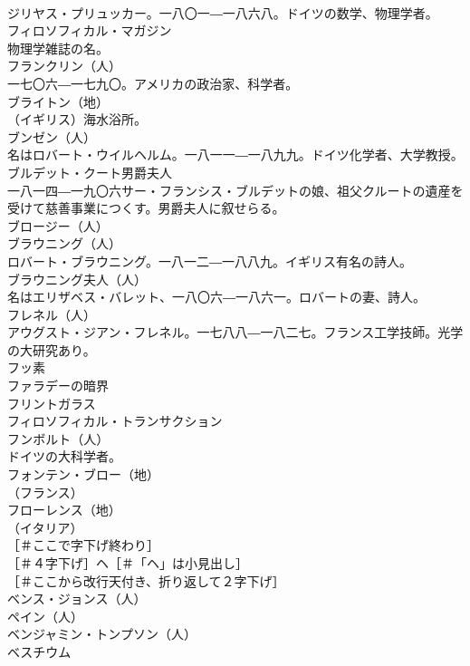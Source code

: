 \documentclass[8pt]{extreport}
\begin{document}
\begin{CJK}{UTF8}{min}
\\	ジリヤス・プリュッカー。一八〇一―一八六八。ドイツの数学、物理学者。
\\	フィロソフィカル・マガジン  
\\	物理学雑誌の名。
\\	フランクリン（人）
\\	一七〇六―一七九〇。アメリカの政治家、科学者。
\\	ブライトン（地）
\\	（イギリス）海水浴所。
\\	ブンゼン（人）
\\	名はロバート・ウイルヘルム。一八一一―一八九九。ドイツ化学者、大学教授。
\\	ブルデット・クート男爵夫人 
\\	一八一四―一九〇六サー・フランシス・ブルデットの娘、祖父クルートの遺産を受けて慈善事業につくす。男爵夫人に叙せらる。
\\	ブロージー（人）
\\	ブラウニング（人）
\\	ロバート・ブラウニング。一八一二―一八八九。イギリス有名の詩人。
\\	ブラウニング夫人（人）
\\	名はエリザベス・バレット、一八〇六―一八六一。ロバートの妻、詩人。
\\	フレネル（人）
\\	アウグスト・ジアン・フレネル。一七八八―一八二七。フランス工学技師。光学の大研究あり。
\\	フッ素 
\\	ファラデーの暗界 
\\	フリントガラス 
\\	フィロソフィカル・トランサクション 
\\	フンボルト（人）
\\	ドイツの大科学者。
\\	フォンテン・ブロー（地）
\\	（フランス）
\\	フローレンス（地）
\\	（イタリア）
\\	［＃ここで字下げ終わり］
\\	［＃４字下げ］ヘ［＃「ヘ」は小見出し］
\\	［＃ここから改行天付き、折り返して２字下げ］
\\	ベンス・ジョンス（人）
\\	ペイン（人）
\\	ベンジャミン・トンプソン（人）
\\	ベスチウム 

\end{CJK}
\end{document}
